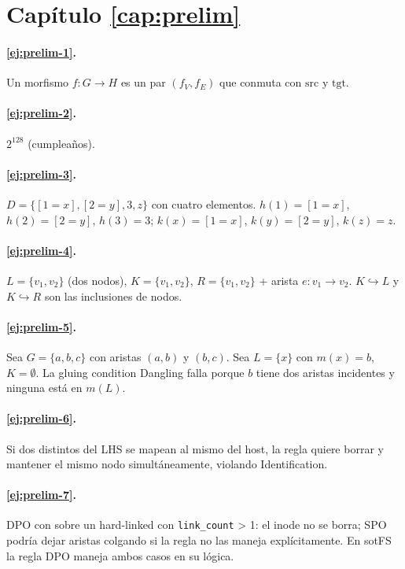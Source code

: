 \section*{Capítulo \ref{cap:prelim}}

\paragraph{\ref{ej:prelim-1}.} Un morfismo $f: G \to H$ es un par
$(f_V, f_E)$ que conmuta con $\mathrm{src}$ y $\mathrm{tgt}$.

\paragraph{\ref{ej:prelim-2}.} $2^{128}$ (cumpleaños).

\paragraph{\ref{ej:prelim-3}.} $D = \{[1=x], [2=y], 3, z\}$ con cuatro
elementos. $h(1) = [1=x]$, $h(2) = [2=y]$, $h(3) = 3$; $k(x) = [1=x]$,
$k(y) = [2=y]$, $k(z) = z$.

\paragraph{\ref{ej:prelim-4}.} $L = \{v_1, v_2\}$ (dos nodos),
$K = \{v_1, v_2\}$, $R = \{v_1, v_2\}$ + arista $e: v_1 \to v_2$.
$K \hookrightarrow L$ y $K \hookrightarrow R$ son las inclusiones de
nodos.

\paragraph{\ref{ej:prelim-5}.} Sea $G = \{a, b, c\}$ con aristas
$(a,b)$ y $(b,c)$. Sea $L = \{x\}$ con $m(x) = b$, $K = \emptyset$.
La gluing condition Dangling falla porque $b$ tiene dos aristas
incidentes y ninguna está en $m(L)$.

\paragraph{\ref{ej:prelim-6}.} Si dos \Dir{} distintos del LHS se
mapean al mismo \Dir{} del host, la regla quiere borrar y mantener el
mismo nodo simultáneamente, violando Identification.

\paragraph{\ref{ej:prelim-7}.} DPO con \opunlink{} sobre un hard-linked
con \texttt{link\_count} > 1: el inode no se borra; SPO podría dejar
aristas colgando si la regla no las maneja explícitamente. En sotFS la
regla DPO maneja ambos casos en su lógica.

